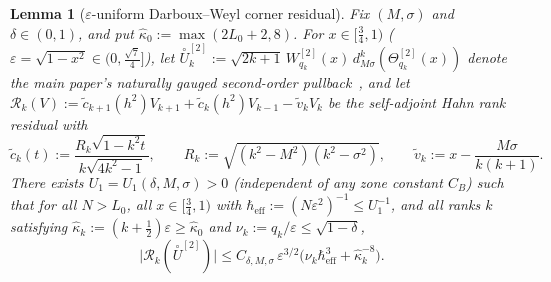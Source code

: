 \documentclass[11pt]{article}
\newtheorem{lemma}[theorem]{Lemma}
\theoremstyle{definition}
\theoremstyle{remark}
\newcommand{\cR}{\mathcal{R}}
\newcommand{\heff}{\hbar_{\mathrm{eff}}}
\renewcommand{\_}{\oldunderscore\penalty0\hskip0pt\relax}
\begin{document}
\begin{lemma}[$\varepsilon$-uniform Darboux--Weyl corner residual]
\label{lem:eps-darboux-corner}
Fix $(M,\sigma)$ and $\delta\in(0,1)$, and put $\hat{\kappa}_0:=\max(2L_0+2,8)$. For $x\in[\frac34,1)$
  ($\varepsilon=\sqrt{1-x^2}\in(0,\frac{\sqrt{7}}{4}]$), let
  $\stackrel{\circ}{U}_k^{[2]}:=\sqrt{2k+1}\,W_{q_k}^{[2]}(x)\,d^k_{M\sigma}(\Theta_{q_k}^{[2]}(x))$ denote the main paper's naturally
  gauged second-order pullback~\cite[Eq.~(49)]{LewisGrowingRank}, and let
  $\cR_k(V):=\tilde{c}_{k+1}(h^2)V_{k+1}+\tilde{c}_k(h^2)V_{k-1}-\tilde{v}_k V_k$ be the self-adjoint Hahn rank residual with
\begin{equation}
  \tilde{c}_k(t) := \frac{R_k\sqrt{1-k^2 t}}{k\sqrt{4k^2-1}},\qquad R_k := \sqrt{(k^2-M^2)(k^2-\sigma^2)},\qquad \tilde{v}_k := x - \frac{M\sigma}{k(k+1)}.
  \label{eq:sym-hahn-coeffs}
\end{equation}
There exists $U_1=U_1(\delta,M,\sigma)>0$ (independent of any zone constant $C_B$) such that for all $N>L_0$, all
  $x\in[\frac34,1)$ with $\heff:=(N\varepsilon^2)^{-1}\le U_1^{-1}$, and all ranks $k$ satisfying
  $\hat{\kappa}_k:=(k+\frac12)\varepsilon\ge\hat{\kappa}_0$ and $\nu_k:=q_k/\varepsilon\le\sqrt{1-\delta}$,
\begin{equation}
  \bigl|\cR_k(\stackrel{\circ}{U}^{[2]})\bigr| \le C_{\delta,M,\sigma}\,\varepsilon^{3/2}\bigl(\nu_k\heff^3 + \hat{\kappa}_k^{-8}\bigr).
  \label{eq:eps-corner-residual}
\end{equation}
\end{lemma}
\end{document}
